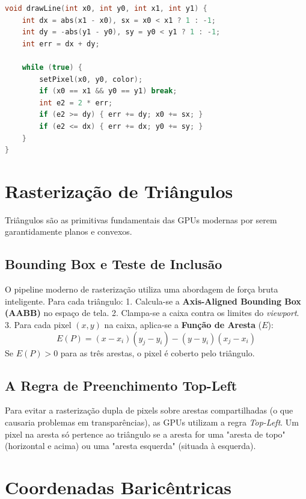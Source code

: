 \begin{lstlisting}[language=C++, caption=Algoritmo de Bresenham Robusto]
void drawLine(int x0, int y0, int x1, int y1) {
    int dx = abs(x1 - x0), sx = x0 < x1 ? 1 : -1;
    int dy = -abs(y1 - y0), sy = y0 < y1 ? 1 : -1;
    int err = dx + dy;

    while (true) {
        setPixel(x0, y0, color);
        if (x0 == x1 && y0 == y1) break;
        int e2 = 2 * err;
        if (e2 >= dy) { err += dy; x0 += sx; }
        if (e2 <= dx) { err += dx; y0 += sy; }
    }
}
\end{lstlisting}

\section{Rasterização de Triângulos}

Triângulos são as primitivas fundamentais das GPUs modernas por serem garantidamente planos e convexos.

\subsection{Bounding Box e Teste de Inclusão}

O pipeline moderno de rasterização utiliza uma abordagem de força bruta inteligente. Para cada triângulo:
1. Calcula-se a \textbf{Axis-Aligned Bounding Box (AABB)} no espaço de tela.
2. Clampa-se a caixa contra os limites do \textit{viewport}.
3. Para cada pixel $(x, y)$ na caixa, aplica-se a \textbf{Função de Aresta} ($E$):
\begin{equation}
    E(P) = (x - x_i)(y_j - y_i) - (y - y_i)(x_j - x_i)
\end{equation}
Se $E(P) > 0$ para as três arestas, o pixel é coberto pelo triângulo.

\subsection{A Regra de Preenchimento Top-Left}

Para evitar a rasterização dupla de pixels sobre arestas compartilhadas (o que causaria problemas em transparências), as GPUs utilizam a regra \textit{Top-Left}. Um pixel na aresta só pertence ao triângulo se a aresta for uma "aresta de topo" (horizontal e acima) ou uma "aresta esquerda" (situada à esquerda).

\section{Coordenadas Baricêntricas}

